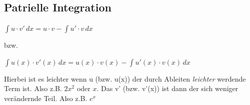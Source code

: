 \documentclass[12pt,a4paper]{article}
\begin{document}
	\subsection{Patrielle Integration}
	\begin{center}
		$\int u \cdot v' \,dx = u \cdot v - \int u' \cdot v \,dx$
	\end{center}
	bzw.\newline
	\begin{center}
		$\int u(x) \cdot v'(x) \,dx = u(x) \cdot v(x) - \int u'(x) \cdot v(x) \,dx$
	\end{center}
	Hierbei ist es leichter wenn u (bzw. u(x)) der durch Ableiten \textit{leichter} werdende Term ist. Also z.B. $2x^2$ oder $x$. \newline
	Das v' (bzw. v'(x)) ist dann der sich weniger verändernde Teil. Also z.B. $e^x$
\end{document}
